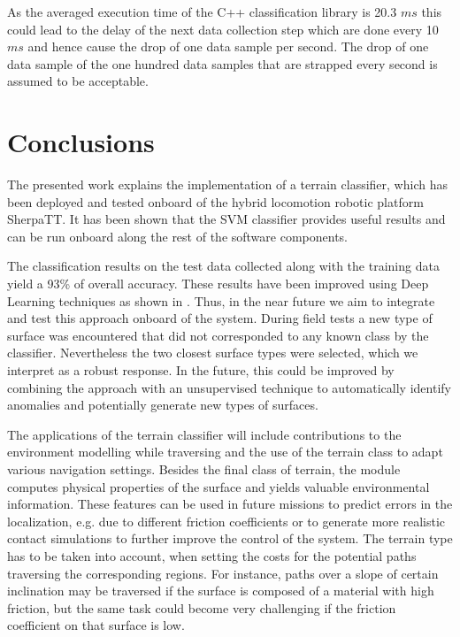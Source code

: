 \documentclass{article}
\begin{document}
As the averaged execution time of the C++ classification library is 20.3 $ms$ this could lead to the delay of the next data collection step which are done every 10 $ms$ and hence cause the drop of one data sample per second. 
The drop of one data sample of the one hundred data samples that are strapped every second is assumed to be acceptable.


\section{Conclusions}

The presented work explains the implementation of a terrain classifier, which has been deployed and tested onboard of the hybrid locomotion robotic platform SherpaTT.
It has been shown that the SVM classifier provides useful results and can be run onboard along the rest of the software components.

The classification results on the test data collected along with the training data yield a 93\% of overall accuracy. 
These results have been improved using Deep Learning techniques as shown in \cite{ugenti2021}. 
Thus, in the near future we aim to integrate and test this approach onboard of the system.
During field tests a new type of surface was encountered that did not corresponded to any known class by the classifier. 
Nevertheless the two closest surface types were selected, which we interpret as a robust response.
In the future, this could be improved by combining the approach with an unsupervised technique to automatically identify anomalies and potentially generate new types of surfaces.

The applications of the terrain classifier will include contributions to the environment modelling while traversing and the use of the terrain class to adapt various navigation settings.
Besides the final class of terrain, the module computes physical properties of the surface and yields valuable environmental information. 
These features can be used in future missions to predict errors in the localization, e.g. due to different friction coefficients or to generate more realistic contact simulations to further improve the control of the system.
The terrain type has to be taken into account, when setting the costs for the potential paths traversing the corresponding regions. 
For instance, paths over a slope of certain inclination may be traversed if the surface is composed of a material with high friction, but the same task could become very challenging if the friction coefficient on that surface is low. 

\clearpage



\end{document}

